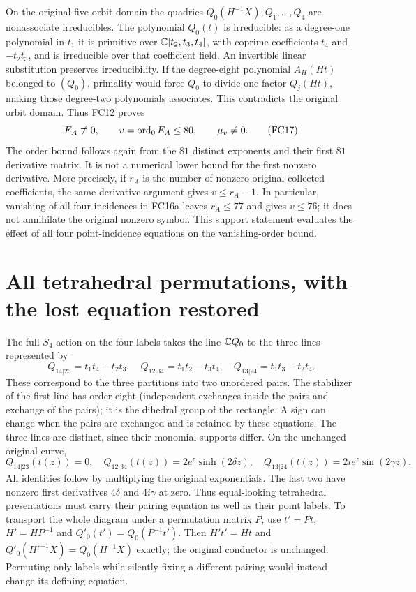 On the original five-orbit domain the quadrics $Q_0(H^{-1}X),Q_1,\ldots,Q_4$
are nonassociate irreducibles. The polynomial $Q_0(t)$ is irreducible:
as a degree-one polynomial in $t_1$ it is primitive over
$\mathbb C[t_2,t_3,t_4]$, with coprime coefficients $t_4$ and $-t_2t_3$,
and is irreducible over that coefficient field. An invertible linear
substitution preserves irreducibility. If the degree-eight polynomial
$A_H(Ht)$ belonged to $(Q_0)$, primality would force $Q_0$ to divide
one factor $Q_j(Ht)$, making those degree-two polynomials associates.
This contradicts the original orbit domain. Thus FC12 proves
\[
 E_A\not\equiv0,\qquad
 v=\operatorname{ord}_0E_A\le80,\qquad\mu_v\ne0.
 \tag{FC17}
\]
The order bound follows again from the $81$ distinct exponents and their
first $81$ derivative matrix. It is not a numerical lower bound for the
first nonzero derivative.
More precisely, if $r_A$ is the number of nonzero original collected
coefficients, the same derivative argument gives $v\le r_A-1$.
In particular, vanishing of all four incidences in FC16a leaves
$r_A\le77$ and gives $v\le76$; it does not annihilate the original
nonzero symbol. This support statement evaluates the effect of all four
point-incidence equations on the vanishing-order bound.

\section{All tetrahedral permutations, with the lost equation restored}
The full $S_4$ action on the four labels takes the line $\mathbb C Q_0$ to
the three lines represented by
\[
 Q_{14|23}=t_1t_4-t_2t_3,\quad
 Q_{12|34}=t_1t_2-t_3t_4,\quad
 Q_{13|24}=t_1t_3-t_2t_4.
 \tag{FC18}
\]
These correspond to the three partitions into two unordered pairs.
The stabilizer of the first line has order eight (independent exchanges
inside the pairs and exchange of the pairs); it is the dihedral group
of the rectangle. A sign can change when the pairs are exchanged and
is retained by these equations. The three lines are distinct, since
their monomial supports differ. On the unchanged original curve,
\[
 Q_{14|23}(t(z))=0,\quad
 Q_{12|34}(t(z))=2e^z\sinh(2\delta z),\quad
 Q_{13|24}(t(z))=2ie^z\sin(2\gamma z).
 \tag{FC19}
\]
All identities follow by multiplying the original exponentials. The
last two have nonzero first derivatives $4\delta$ and $4i\gamma$ at zero.
Thus equal-looking tetrahedral presentations must carry their pairing
equation as well as their point labels. To transport the whole diagram
under a permutation matrix $P$, use $t'=Pt$, $H'=HP^{-1}$ and
$Q'_0(t')=Q_0(P^{-1}t')$. Then $H't'=Ht$ and
$Q'_0(H'^{-1}X)=Q_0(H^{-1}X)$ exactly; the original conductor is unchanged.
Permuting only labels while silently fixing a different pairing would
instead change its defining equation.

